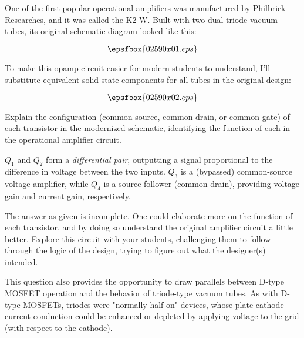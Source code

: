 

One of the first popular operational amplifiers was manufactured by Philbrick Researches, and it was called the K2-W.  Built with two dual-triode vacuum tubes, its original schematic diagram looked like this:

$$\epsfbox{02590x01.eps}$$

To make this opamp circuit easier for modern students to understand, I'll substitute equivalent solid-state components for all tubes in the original design:

$$\epsfbox{02590x02.eps}$$

Explain the configuration (common-source, common-drain, or common-gate) of each transistor in the modernized schematic, identifying the function of each in the operational amplifier circuit.







$Q_1$ and $Q_2$ form a {\it differential pair}, outputting a signal proportional to the difference in voltage between the two inputs.  $Q_3$ is a (bypassed) common-source voltage amplifier, while $Q_4$ is a source-follower (common-drain), providing voltage gain and current gain, respectively.







The answer as given is incomplete.  One could elaborate more on the function of each transistor, and by doing so understand the original amplifier circuit a little better.  Explore this circuit with your students, challenging them to follow through the logic of the design, trying to figure out what the designer(s) intended.

This question also provides the opportunity to draw parallels between D-type MOSFET operation and the behavior of triode-type vacuum tubes.  As with D-type MOSFETs, triodes were "normally half-on" devices, whose plate-cathode current conduction could be enhanced or depleted by applying voltage to the grid (with respect to the cathode).




